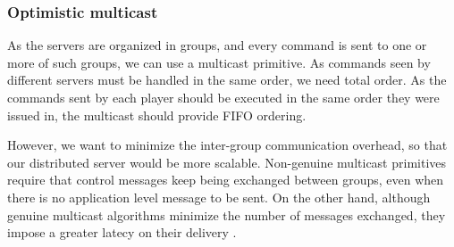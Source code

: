 \documentclass[]{usiinfprospectus}
\begin{document}
\subsubsection{Optimistic multicast} \label{sec:optmcast}

As the servers are organized in groups, and every command is sent to one or more of such groups, we can use a multicast primitive. As commands seen by different servers must be handled in the same order, we need total order. As the commands sent by each player should be executed in the same order they were issued in, the multicast should provide FIFO ordering.

However, we want to minimize the inter-group communication overhead, so that our distributed server would be more scalable. Non-genuine multicast primitives \cite{schiper2009gng} require that control messages keep being exchanged between groups, even when there is no application level message to be sent. On the other hand, although genuine multicast algorithms minimize the number of messages exchanged, they impose a greater latecy on their delivery \cite{schiper2008ica}.

% 
% 
% 
% 
% 
% 
% 
% 
% 
% 
% 
\end{document}
